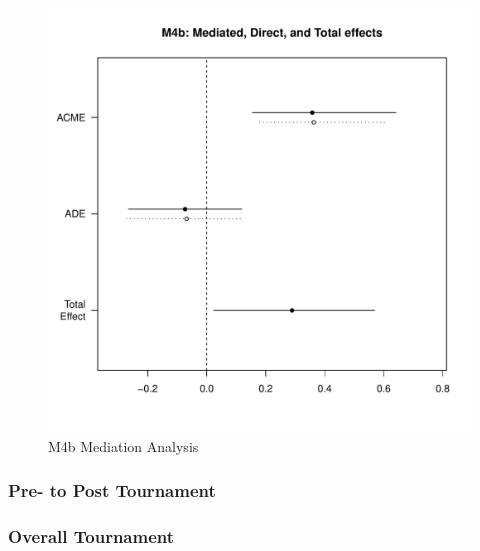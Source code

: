 {               \begin{figure}[htbp]
                 \centering
                 \includegraphics[scale = .5]{images/MLM4bMediationEffects.pdf}
                 \caption{M4b Mediation Analysis}
                 \label{fig:MLM4bMediationAnalysis}
               \end{figure}



            \subsubsection{Pre- to Post Tournament}

            \subsubsection{Overall Tournament}


                    


}
